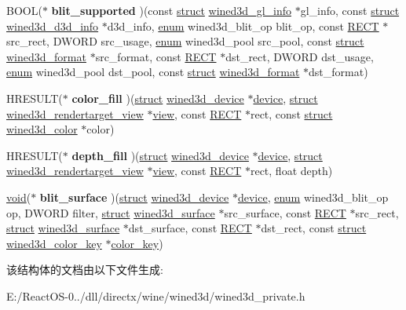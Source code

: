 \begin{DoxyCompactItemize}
B\+O\+OL($\ast$ {\bfseries blit\+\_\+supported} )(const \hyperlink{interfacestruct}{struct} \hyperlink{structwined3d__gl__info}{wined3d\+\_\+gl\+\_\+info} $\ast$gl\+\_\+info, const \hyperlink{interfacestruct}{struct} \hyperlink{structwined3d__d3d__info}{wined3d\+\_\+d3d\+\_\+info} $\ast$d3d\+\_\+info, \hyperlink{interfaceenum}{enum} wined3d\+\_\+blit\+\_\+op blit\+\_\+op, const \hyperlink{structtag_r_e_c_t}{R\+E\+CT} $\ast$src\+\_\+rect, D\+W\+O\+RD src\+\_\+usage, \hyperlink{interfaceenum}{enum} wined3d\+\_\+pool src\+\_\+pool, const \hyperlink{interfacestruct}{struct} \hyperlink{structwined3d__format}{wined3d\+\_\+format} $\ast$src\+\_\+format, const \hyperlink{structtag_r_e_c_t}{R\+E\+CT} $\ast$dst\+\_\+rect, D\+W\+O\+RD dst\+\_\+usage, \hyperlink{interfaceenum}{enum} wined3d\+\_\+pool dst\+\_\+pool, const \hyperlink{interfacestruct}{struct} \hyperlink{structwined3d__format}{wined3d\+\_\+format} $\ast$dst\+\_\+format)
\item 
\mbox{\label{structblit__shader_aa5d53023e6b660890c5a20027230aba4}} 
H\+R\+E\+S\+U\+LT($\ast$ {\bfseries color\+\_\+fill} )(\hyperlink{interfacestruct}{struct} \hyperlink{structwined3d__device}{wined3d\+\_\+device} $\ast$\hyperlink{structdevice}{device}, \hyperlink{interfacestruct}{struct} \hyperlink{structwined3d__rendertarget__view}{wined3d\+\_\+rendertarget\+\_\+view} $\ast$\hyperlink{structview}{view}, const \hyperlink{structtag_r_e_c_t}{R\+E\+CT} $\ast$rect, const \hyperlink{interfacestruct}{struct} \hyperlink{structwined3d__color}{wined3d\+\_\+color} $\ast$color)
\item 
\mbox{\label{structblit__shader_a4c0daa3d89207fbbca076b234b3157ca}} 
H\+R\+E\+S\+U\+LT($\ast$ {\bfseries depth\+\_\+fill} )(\hyperlink{interfacestruct}{struct} \hyperlink{structwined3d__device}{wined3d\+\_\+device} $\ast$\hyperlink{structdevice}{device}, \hyperlink{interfacestruct}{struct} \hyperlink{structwined3d__rendertarget__view}{wined3d\+\_\+rendertarget\+\_\+view} $\ast$\hyperlink{structview}{view}, const \hyperlink{structtag_r_e_c_t}{R\+E\+CT} $\ast$rect, float depth)
\item 
\mbox{\label{structblit__shader_af5ddd475f9a0a4a76ec4cf4cecc8591b}} 
\hyperlink{interfacevoid}{void}($\ast$ {\bfseries blit\+\_\+surface} )(\hyperlink{interfacestruct}{struct} \hyperlink{structwined3d__device}{wined3d\+\_\+device} $\ast$\hyperlink{structdevice}{device}, \hyperlink{interfaceenum}{enum} wined3d\+\_\+blit\+\_\+op op, D\+W\+O\+RD filter, \hyperlink{interfacestruct}{struct} \hyperlink{structwined3d__surface}{wined3d\+\_\+surface} $\ast$src\+\_\+surface, const \hyperlink{structtag_r_e_c_t}{R\+E\+CT} $\ast$src\+\_\+rect, \hyperlink{interfacestruct}{struct} \hyperlink{structwined3d__surface}{wined3d\+\_\+surface} $\ast$dst\+\_\+surface, const \hyperlink{structtag_r_e_c_t}{R\+E\+CT} $\ast$dst\+\_\+rect, const \hyperlink{interfacestruct}{struct} \hyperlink{structwined3d__color__key}{wined3d\+\_\+color\+\_\+key} $\ast$\hyperlink{structcolor__key}{color\+\_\+key})
\end{DoxyCompactItemize}


该结构体的文档由以下文件生成\+:\begin{DoxyCompactItemize}
\item 
E\+:/\+React\+O\+S-\/0../dll/directx/wine/wined3d/wined3d\+\_\+private.\+h\end{DoxyCompactItemize}
